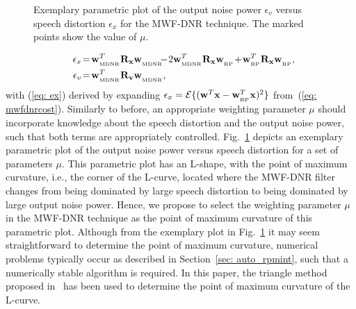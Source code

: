 \documentclass[10pt]{IEEEtran}
\begin{document}
\begin{figure}[b!]
\centering
%
\caption{Exemplary parametric plot of the output noise power $\epsilon_v$ versus speech distortion $\epsilon_x$ for the MWF-DNR technique. The marked points show the value of $\mu$.}
\label{fig: L2}
\end{figure}
{{\begin{align}
\label{eq: ex}
\!\!\!\!\!\epsilon_x & \!=\! \mathbf{w}_{_{\rm MDNR}}^T\mathbf{R}_{\mathbf{x}}\mathbf{w}_{_{\rm MDNR}}^{} \!\!\!-\! 2 \mathbf{w}^T_{_{\rm MDNR}}\mathbf{R}_{\mathbf{x}}\mathbf{w}^{}_{_{\rm RP}} \!+\! \mathbf{w}_{_{\rm RP}}^T\mathbf{R}_{\mathbf{x}}\mathbf{w}_{_{\rm RP}}^{}, \!\!\!\!\\
\label{eq: ev}
\epsilon_v &\!=\! \mathbf{w}_{_{\rm MDNR}}^T\mathbf{R}_{\mathbf{v}}\mathbf{w}_{_{\rm MDNR}}^{},
\end{align}
with (\ref{eq: ex}) derived by expanding $\epsilon_x = {\cal{E}}\{(\mathbf{w}^T\mathbf{x} - \mathbf{w}_{_{\rm RP}}^T\mathbf{x})^2 \}$ from~(\ref{eq: mwfdnrcost}).}}
Similarly to before, an appropriate weighting parameter $\mu$ should incorporate knowledge about the speech distortion and the output noise power, such that both terms are appropriately controlled.
Fig.~\ref{fig: L2} depicts an exemplary parametric plot of the output noise power versus speech distortion for a set of parameters $\mu$.
This parametric plot has an L-shape, with the point of maximum curvature, i.e., the corner of the L-curve, located where the MWF-DNR filter changes from being dominated by large speech distortion to being dominated by large output noise power. 
Hence, we propose to select the weighting parameter $\mu$ in the MWF-DNR technique as the point of maximum curvature of this parametric plot.
Although from the exemplary plot in Fig.~\ref{fig: L2} it may seem straightforward to determine the point of maximum curvature, numerical problems typically occur as described in Section~\ref{sec: auto_rpmint}, such that a numerically stable algorithm is required. 
In this paper, the triangle method proposed in~\cite{Castellanos_2002} has been used to determine the point of maximum curvature of the L-curve.
\end{document}
